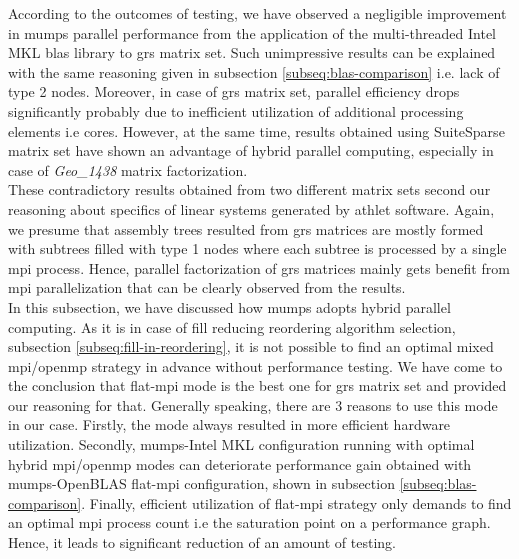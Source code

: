 According to the outcomes of testing, we have observed a negligible improvement in \acrshort{mumps} parallel performance from the application of the multi-threaded Intel MKL \acrshort{blas} library to \acrshort{grs} matrix set. Such unimpressive results can be explained with the same reasoning given in subsection \ref{subseq:blas-comparison} i.e. lack of type 2 nodes. Moreover, in case of \acrshort{grs} matrix set, parallel efficiency drops significantly probably due to inefficient utilization of additional processing elements i.e cores. However, at the same time, results obtained using SuiteSparse matrix set have shown an advantage of hybrid parallel computing, especially in case of \textit{Geo\_1438} matrix factorization.\\


These contradictory results obtained from two different matrix sets second our reasoning about specifics of linear systems generated by \acrshort{athlet} software. Again, we presume that assembly trees resulted from \acrshort{grs} matrices are mostly formed with subtrees filled with type 1 nodes where each subtree is processed by a single \acrshort{mpi} process. Hence, parallel factorization of \acrshort{grs} matrices mainly gets benefit from \acrshort{mpi} parallelization that can be clearly observed from the results.\\



In this subsection, we have discussed how \acrshort{mumps} adopts hybrid parallel computing. As it is in case of fill reducing reordering algorithm selection, subsection \ref{subseq:fill-in-reordering}, it is not possible to find an optimal mixed \acrshort{mpi}/\acrshort{openmp} strategy in advance without performance testing. We have come to the conclusion that flat-\acrshort{mpi} mode is the best one for \acrshort{grs} matrix set and provided our reasoning for that. Generally speaking, there are 3 reasons to use this mode in our case. Firstly, the mode always resulted in more efficient hardware utilization. Secondly,  \acrshort{mumps}-Intel MKL configuration running with optimal hybrid \acrshort{mpi}/\acrshort{openmp} modes can deteriorate performance gain obtained with \acrshort{mumps}-OpenBLAS flat-\acrshort{mpi} configuration, shown in subsection \ref{subseq:blas-comparison}. Finally, efficient utilization of flat-\acrshort{mpi} strategy only demands to find an optimal \acrshort{mpi} process count i.e the saturation point on a performance graph. Hence, it leads to significant reduction of an amount of testing. \\
